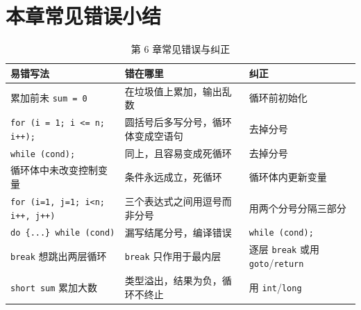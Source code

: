 \section{本章常见错误小结}

\begin{table}[htbp]
\centering
\caption{第 6 章常见错误与纠正}
\small
\begin{tabularx}{\textwidth}{@{}lXl@{}}
\toprule
易错写法 & 错在哪里 & 纠正 \\
\midrule
累加前未 \texttt{sum = 0} & 在垃圾值上累加，输出乱数 & 循环前初始化 \\
\texttt{for (i = 1; i <= n; i++);} & 圆括号后多写分号，循环体变成空语句 & 去掉分号 \\
\texttt{while (cond);} & 同上，且容易变成死循环 & 去掉分号 \\
循环体中未改变控制变量 & 条件永远成立，死循环 & 循环体内更新变量 \\
\texttt{for (i=1, j=1; i<n; i++, j++)} & 三个表达式之间用逗号而非分号 & 用两个分号分隔三部分 \\
\texttt{do \{...\} while (cond)} & 漏写结尾分号，编译错误 & \texttt{while (cond);} \\
\texttt{break} 想跳出两层循环 & \texttt{break} 只作用于最内层 & 逐层 \texttt{break} 或用 \texttt{goto}/\texttt{return} \\
\texttt{short sum} 累加大数 & 类型溢出，结果为负，循环不终止 & 用 \texttt{int}/\texttt{long} \\
\bottomrule
\end{tabularx}
\end{table}
